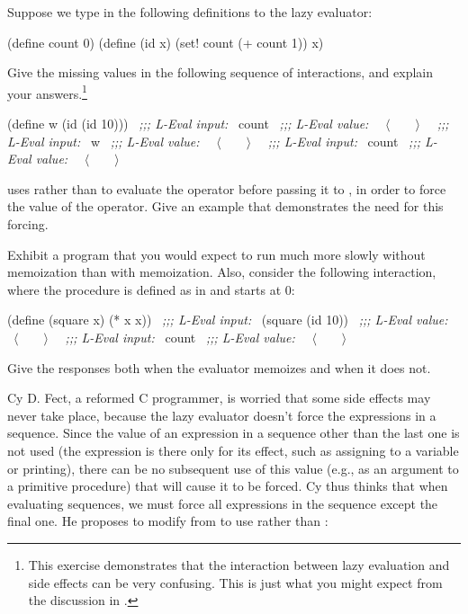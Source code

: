 \begin{exerciseGroup}
\label{Exercise 4.27}
 Suppose we type in the following
definitions to the lazy evaluator:

\begin{codeBlock}
(define count 0)
(define (id x) (set! count (+ count 1)) x)
\end{codeBlock}

Give the missing values in the following sequence of interactions, and explain
your answers.\footnote{This exercise demonstrates that the interaction between
lazy evaluation and side effects can be very confusing.  This is just what you
might expect from the discussion in .}

\begin{codeBlock}
(define w (id (id 10)))
~\textit{;;; L-Eval input:}~
count
~\textit{;;; L-Eval value:}~
~\(\langle \)~~~~\(\rangle \)~
~\textit{;;; L-Eval input:}~
w
~\textit{;;; L-Eval value:}~
~\(\langle \)~~~~\(\rangle \)~
~\textit{;;; L-Eval input:}~
count
~\textit{;;; L-Eval value:}~
~\(\langle \)~~~~\(\rangle \)~
\end{codeBlock}

\label{Exercise 4.28}
  uses
 rather than  to evaluate the operator before
passing it to , in order to force the value of the operator.  Give
an example that demonstrates the need for this forcing.

\noindent
{}\label{Exercise 4.29}
 Exhibit a program that you would
expect to run much more slowly without memoization than with memoization.
Also, consider the following interaction, where the  procedure is
defined as in  and  starts at 0:

\begin{codeBlock}
(define (square x) (* x x))
~\textit{;;; L-Eval input:}~
(square (id 10))
~\textit{;;; L-Eval value:}~
~\(\langle \)~~~~\(\rangle \)~
~\textit{;;; L-Eval input:}~
count
~\textit{;;; L-Eval value:}~
~\(\langle \)~~~~\(\rangle \)~
\end{codeBlock}

Give the responses both when the evaluator memoizes and when it does not.

\label{Exercise 4.30}
 Cy D. Fect, a reformed C
programmer, is worried that some side effects may never take place, because the
lazy evaluator doesn't force the expressions in a sequence.  Since the value of
an expression in a sequence other than the last one is not used (the expression
is there only for its effect, such as assigning to a variable or printing),
there can be no subsequent use of this value (e.g., as an argument to a
primitive procedure) that will cause it to be forced.  Cy thus thinks that when
evaluating sequences, we must force all expressions in the sequence except the
final one.  He proposes to modify  from 
to use  rather than :


\end{exerciseGroup}

